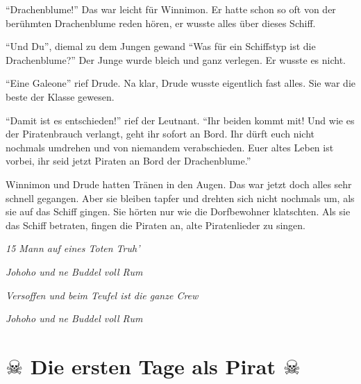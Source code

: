 \enquote{Drachenblume!} Das war leicht für Winnimon. Er hatte schon so oft von der berühmten Drachenblume reden hören, er wusste alles über dieses Schiff. 

\enquote{Und Du}, diemal zu dem Jungen gewand \enquote{Was für ein Schiffstyp ist die Drachenblume?} Der Junge wurde bleich und ganz verlegen. Er wusste es nicht.

\enquote{Eine Galeone} rief Drude. Na klar, Drude wusste eigentlich fast alles. Sie war die beste der Klasse gewesen. 

\enquote{Damit ist es entschieden!} rief der Leutnant. \enquote{Ihr beiden kommt mit! Und wie es der Piratenbrauch verlangt, geht ihr sofort an Bord. Ihr dürft euch nicht nochmals umdrehen und von niemandem verabschieden. Euer altes Leben ist vorbei, ihr seid jetzt Piraten an Bord der Drachenblume.}

Winnimon und Drude hatten Tränen in den Augen. Das war jetzt doch alles sehr schnell gegangen. Aber sie bleiben tapfer und drehten sich nicht nochmals um, als sie auf das Schiff gingen. Sie hörten nur wie die Dorfbewohner klatschten. Als sie das Schiff betraten, fingen die Piraten an, alte Piratenlieder zu singen.

\itshape{15 Mann auf eines Toten Truh'}

\itshape{Johoho und ne Buddel voll Rum}

\itshape{Versoffen und beim Teufel ist die ganze Crew}

\itshape{Johoho und ne Buddel voll Rum}

\section*{\center $\skull$ Die ersten Tage als Pirat $\skull$}




  \hfill {\color{red}\decofourleft}
